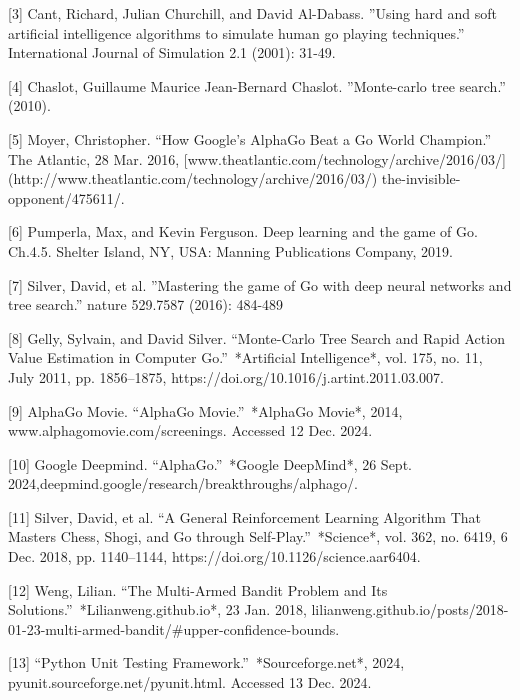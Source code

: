 \documentclass[]{final_report}
\begin{document}
[3] Cant, Richard, Julian Churchill, and David Al-Dabass. ”Using hard and soft artificial intelligence algorithms to simulate human go playing techniques.” International Journal
of Simulation 2.1 (2001): 31-49.\newline

[4] Chaslot, Guillaume Maurice Jean-Bernard Chaslot. ”Monte-carlo tree search.” (2010).\newline

[5] Moyer, Christopher. “How Google’s AlphaGo Beat a Go World Champion.”
The Atlantic, 28 Mar. 2016, [www.theatlantic.com/technology/archive/2016/03/]
(http://www.theatlantic.com/technology/archive/2016/03/)
the-invisible-opponent/475611/.\newline

[6] Pumperla, Max, and Kevin Ferguson. Deep learning and the game of Go. Ch.4.5. Shelter
Island, NY, USA: Manning Publications Company, 2019.\newline

[7] Silver, David, et al. ”Mastering the game of Go with deep neural networks and tree
search.” nature 529.7587 (2016): 484-489\newline

[8] Gelly, Sylvain, and David Silver. “Monte-Carlo Tree Search and Rapid Action Value Estimation in Computer Go.” *Artificial Intelligence*, vol. 175, no. 11, July 2011, pp. 1856–1875, https://doi.org/10.1016/j.artint.2011.03.007.\newline

[9] AlphaGo Movie. “AlphaGo Movie.” *AlphaGo Movie*, 2014, www.alphagomovie.com/screenings. Accessed 12 Dec. 2024.\newline

[10] Google Deepmind. “AlphaGo.” *Google DeepMind*, 26 Sept. 2024,deepmind.google/research/breakthroughs/alphago/.\newline

[11] Silver, David, et al. “A General Reinforcement Learning Algorithm That Masters Chess, Shogi, and Go through Self-Play.” *Science*, vol. 362, no. 6419, 6 Dec. 2018, pp. 1140–1144, https://doi.org/10.1126/science.aar6404.
\newline

[12] Weng, Lilian. “The Multi-Armed Bandit Problem and Its Solutions.” *Lilianweng.github.io*, 23 Jan. 2018, lilianweng.github.io/posts/2018-01-23-multi-armed-bandit/#upper-confidence-bounds.
\newline

[13] “Python Unit Testing Framework.” *Sourceforge.net*, 2024, pyunit.sourceforge.net/pyunit.html. Accessed 13 Dec. 2024.

\label{endpage}
\end{document}
